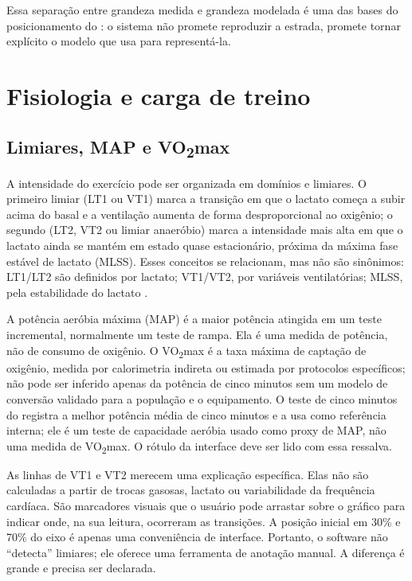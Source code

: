 Essa separação entre grandeza medida e grandeza modelada é uma das bases do
posicionamento do \argus{}: o sistema não promete reproduzir a estrada, promete
tornar explícito o modelo que usa para representá-la.

\section{Fisiologia e carga de treino}
\label{sec:fisiologia}

\subsection{Limiares, MAP e \texorpdfstring{VO\textsubscript{2}max}{VO2max}}
\label{sec:limiares}

A intensidade do exercício pode ser organizada em domínios e limiares. O
primeiro limiar (LT1 ou VT1) marca a transição em que o lactato começa a subir
acima do basal e a ventilação aumenta de forma desproporcional ao oxigênio; o
segundo (LT2, VT2 ou limiar anaeróbio) marca a intensidade mais alta em que o
lactato ainda se mantém em estado quase estacionário, próxima da máxima fase
estável de lactato (MLSS). Esses conceitos se relacionam, mas não são
sinônimos: LT1/LT2 são definidos por lactato; VT1/VT2, por variáveis
ventilatórias; MLSS, pela estabilidade do lactato \cite{faude2009,meyer2005}.

A potência aeróbia máxima (MAP) é a maior potência atingida em um teste
incremental, normalmente um teste de rampa. Ela é uma medida de potência, não
de consumo de oxigênio. O VO\textsubscript{2}max é a taxa máxima de captação de
oxigênio, medida por calorimetria indireta ou estimada por protocolos
específicos; não pode ser inferido apenas da potência de cinco minutos sem
um modelo de conversão validado para a população e o equipamento. O teste de
cinco minutos do \argus{} registra a melhor potência média de cinco minutos e
a usa como referência interna; ele é um teste de capacidade aeróbia usado como
proxy de MAP, não uma medida de VO\textsubscript{2}max. O rótulo da interface deve ser lido
com essa ressalva.



As linhas de VT1 e VT2 merecem uma explicação específica. Elas não são
calculadas a partir de trocas gasosas, lactato ou variabilidade da frequência
cardíaca. São marcadores visuais que o usuário pode arrastar sobre o gráfico
para indicar onde, na sua leitura, ocorreram as transições. A posição inicial
em 30\% e 70\% do eixo é apenas uma conveniência de interface. Portanto, o
software não ``detecta'' limiares; ele oferece uma ferramenta de anotação
manual. A diferença é grande e precisa ser declarada.

